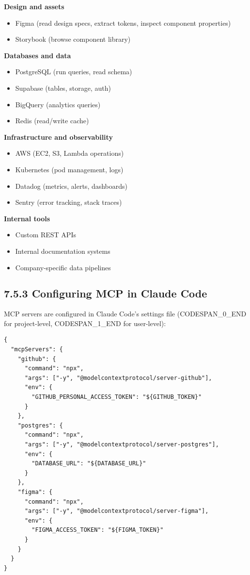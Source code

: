 \documentclass[11pt,a4paper]{book}
\begin{document}
\textbf{Design and assets}
\begin{itemize}
  \item Figma (read design specs, extract tokens, inspect component properties)
  \item Storybook (browse component library)
\end{itemize}

\textbf{Databases and data}
\begin{itemize}
  \item PostgreSQL (run queries, read schema)
  \item Supabase (tables, storage, auth)
  \item BigQuery (analytics queries)
  \item Redis (read/write cache)
\end{itemize}

\textbf{Infrastructure and observability}
\begin{itemize}
  \item AWS (EC2, S3, Lambda operations)
  \item Kubernetes (pod management, logs)
  \item Datadog (metrics, alerts, dashboards)
  \item Sentry (error tracking, stack traces)
\end{itemize}

\textbf{Internal tools}
\begin{itemize}
  \item Custom REST APIs
  \item Internal documentation systems
  \item Company-specific data pipelines
\end{itemize}

\subsection{7.5.3 Configuring MCP in Claude Code}

MCP servers are configured in Claude Code's settings file (CODESPAN\_0\_END for project-level, CODESPAN\_1\_END for user-level):

\begin{lstlisting}
{
  "mcpServers": {
    "github": {
      "command": "npx",
      "args": ["-y", "@modelcontextprotocol/server-github"],
      "env": {
        "GITHUB_PERSONAL_ACCESS_TOKEN": "${GITHUB_TOKEN}"
      }
    },
    "postgres": {
      "command": "npx",
      "args": ["-y", "@modelcontextprotocol/server-postgres"],
      "env": {
        "DATABASE_URL": "${DATABASE_URL}"
      }
    },
    "figma": {
      "command": "npx",
      "args": ["-y", "@modelcontextprotocol/server-figma"],
      "env": {
        "FIGMA_ACCESS_TOKEN": "${FIGMA_TOKEN}"
      }
    }
  }
}
\end{lstlisting}
\end{document}
